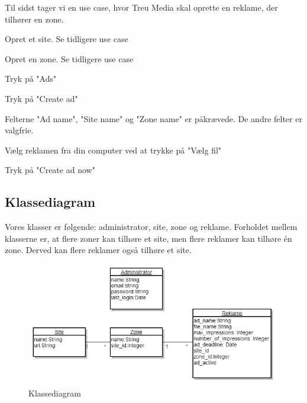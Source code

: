 \documentclass[a4paper,12pt]{article}
\begin{document}
Til sidst tager vi en use case, hvor Treu Media skal oprette en reklame, der tilhører en zone.
\begin{usecase}
 {
	\item Opret et site. Se tidligere use case
	\item Opret en zone. Se tidligere use case
	\item Tryk på "Ads"
	\item Tryk på "Create ad"
	\item Felterne "Ad name", "Site name" og "Zone name" er påkrævede. De andre felter er valgfrie.
	\item Vælg reklamen fra din computer ved at trykke på "Vælg fil"
	\item Tryk på "Create ad now"
}
\end{usecase}

\subsection{Klassediagram}
Vores klasser er følgende: administrator, site, zone og reklame. Forholdet mellem klasserne er, at flere zoner kan tilhøre et site, men flere reklamer kan tilhøre én zone. Derved kan flere reklamer også tilhøre et site.

\begin{figure}[h!]
  \centering
    \includegraphics[scale=0.5]{klasse_diagram.png}
  \caption{Klassediagram}
\end{figure}
\end{document}
